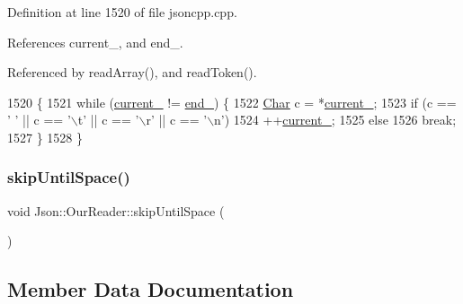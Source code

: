 Definition at line 1520 of file jsoncpp.\+cpp.



References current\+\_\+, and end\+\_\+.



Referenced by read\+Array(), and read\+Token().


\begin{DoxyCode}
1520                            \{
1521   \textcolor{keywordflow}{while} (\hyperlink{class_json_1_1_our_reader_a5211fbbba94be80a22dd2317c621efcc}{current\_} != \hyperlink{class_json_1_1_our_reader_ab1f69b0260c27a0d2d65dc56e42c8f9d}{end\_}) \{
1522     \hyperlink{class_json_1_1_our_reader_a0cd0bab4caa66594ab843ccd5f9dc239}{Char} c = *\hyperlink{class_json_1_1_our_reader_a5211fbbba94be80a22dd2317c621efcc}{current\_};
1523     \textcolor{keywordflow}{if} (c == \textcolor{charliteral}{' '} || c == \textcolor{charliteral}{'\(\backslash\)t'} || c == \textcolor{charliteral}{'\(\backslash\)r'} || c == \textcolor{charliteral}{'\(\backslash\)n'})
1524       ++\hyperlink{class_json_1_1_our_reader_a5211fbbba94be80a22dd2317c621efcc}{current\_};
1525     \textcolor{keywordflow}{else}
1526       \textcolor{keywordflow}{break};
1527   \}
1528 \}
\end{DoxyCode}
\mbox{\label{class_json_1_1_our_reader_ad48bdaf5b686706f003e792fdbcbf102}} 
\subsubsection{\texorpdfstring{skip\+Until\+Space()}{skipUntilSpace()}}
{\footnotesize\ttfamily void Json\+::\+Our\+Reader\+::skip\+Until\+Space (\begin{DoxyParamCaption}{ }\end{DoxyParamCaption})\hspace{0.3cm}{\ttfamily [private]}}



\subsection{Member Data Documentation}
\mbox{\label{class_json_1_1_our_reader_a9bda9d72335d52cd06e65f9eca3f70f5}} 
